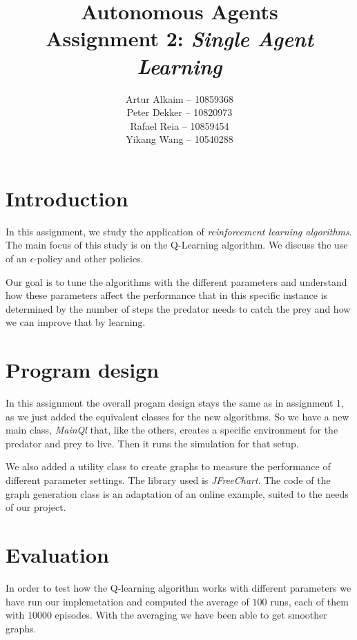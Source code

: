 \documentclass{article}
\begin{document}
\title{Autonomous Agents\\
Assignment 2: \emph{Single Agent Learning}}
\author{
Artur Alkaim -- 10859368\\
Peter Dekker -- 10820973\\
Rafael Reia -- 10859454\\
Yikang Wang -- 10540288\\
}
\maketitle
\section{Introduction}
In this assignment, we study the application of \emph{reinforcement learning
algorithms}. The main focus of this study is on the Q-Learning algorithm. We discuss the use of an $\epsilon$-policy and other policies.

Our goal is to tune the algorithms with the different parameters and understand how these parameters affect the performance that in this specific instance is determined by the number of steps the predator needs to catch the prey and how we can improve that by learning. 

\section{Program design}
In this assignment the overall progam design stays the same as in assignment 1, as we just added the equivalent classes for the new algorithms. So we have a new main class, \emph{MainQl} that, like the others, creates a specific environment for the predator and prey to live. Then it runs the simulation for that setup.

We also added a utility class to create graphs to measure the performance of different parameter settings. The library used is \emph{JFreeChart}. The code of the graph generation class is an adaptation of an online example, suited to the needs of our project.

\section{Evaluation}


In order to test how the Q-learning algorithm works with different parameters we
have run our implemetation and computed the average of $100$ runs, each of them
with $10000$ episodes. With the averaging we have been able to get smoother
graphs.
\end{document}
